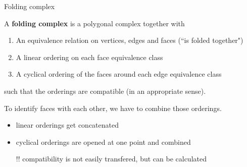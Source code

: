 \begin{frame}{Folding complex}
    \pause
    \begin{defi}
        A \textbf{folding complex}
        \pause
        is a polygonal complex together with
        \begin{enumerate}
            \pause
            \item An equivalence relation on vertices, edges and faces
                \pause (``is folded together")
            \pause
            \item A linear ordering on each face equivalence class
            \pause
            \item A cyclical ordering of the faces around each edge equivalence class
        \end{enumerate}
        \pause
        such that the orderings are compatible
        \pause
        (in an appropriate sense).
    \end{defi}

    \pause
    To identify faces with each other, we have to combine those orderings.
    \begin{itemize}
        \pause
        \item linear orderings get concatenated
        \pause
        \item cyclical orderings are opened at one point
            \pause
            and combined
        \pause
        \item[!!] compatibility is not easily transfered,
            \pause
            but can be calculated
    \end{itemize}

\end{frame}


